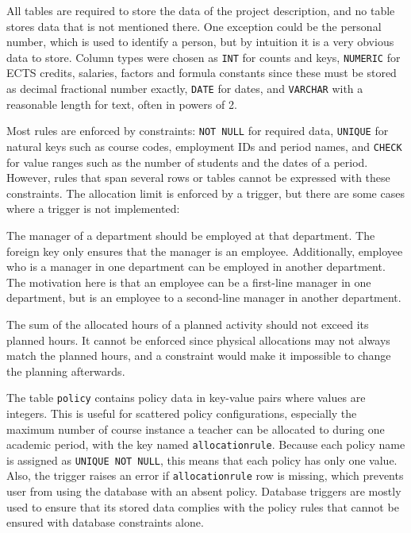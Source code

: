 \documentclass[a4paper]{scrartcl}
\renewcommand{\_}{\textunderscore\allowbreak}
\begin{document}
All tables are required to store the data of the project description, and no table stores data that is not mentioned there. One exception could be the personal number, which is used to identify a person, but by intuition it is a very obvious data to store. Column types were chosen as \texttt{INT} for counts and keys, \texttt{NUMERIC} for ECTS credits, salaries, factors and formula constants since these must be stored as decimal fractional number exactly, \texttt{DATE} for dates, and \texttt{VARCHAR} with a reasonable length for text, often in powers of 2.

Most rules are enforced by constraints: \texttt{NOT NULL} for required data, \texttt{UNIQUE} for natural keys such as course codes, employment IDs and period names, and \texttt{CHECK} for value ranges such as the number of students and the dates of a period. However, rules that span several rows or tables cannot be expressed with these constraints. The allocation limit is enforced by a trigger, but there are some cases where a trigger is not implemented:

The manager of a department should be employed at that department. The foreign key only ensures that the manager is an employee. Additionally, employee who is a manager in one department can be employed in another department. The motivation here is that an employee can be a first-line manager in one department, but is an employee to a second-line manager in another department.

The sum of the allocated hours of a planned activity should not exceed its planned hours. It cannot be enforced since physical allocations may not always match the planned hours, and a constraint would make it impossible to change the planning afterwards.

The table \texttt{policy} contains policy data in key-value pairs where values are integers. This is useful for scattered policy configurations, especially the maximum number of course instance a teacher can be allocated to during one academic period, with the key named \texttt{allocation\_rule}. Because each policy name is assigned as \texttt{UNIQUE NOT NULL}, this means that each policy has only one value. Also, the trigger raises an error if \texttt{allocation\_rule} row is missing, which prevents user from using the database with an absent policy. Database triggers are mostly used to ensure that its stored data complies with the policy rules that cannot be ensured with database constraints alone.
\end{document}
